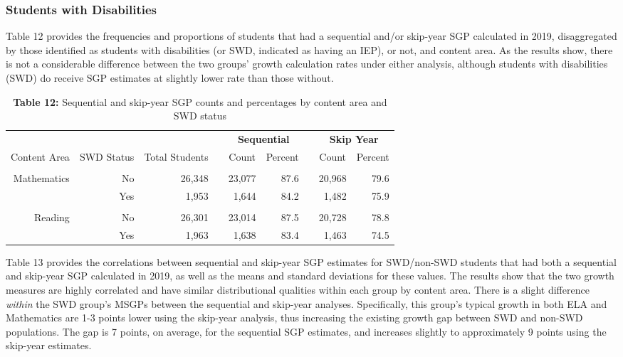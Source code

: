 \documentclass[12pt]{article}
\begin{document}
\hypertarget{students-with-disabilities}{%
\subsubsection{Students with
Disabilities}\label{students-with-disabilities}}

Table 12 provides the frequencies and proportions of students that had a
sequential and/or skip-year SGP calculated in 2019, disaggregated by
those identified as students with disabilities (or SWD, indicated as
having an IEP), or not, and content area. As the results show, there is
not a considerable difference between the two groups' growth calculation
rates under either analysis, although students with disabilities (SWD)
do receive SGP estimates at slightly lower rate than those without.

\begin{table}[H]
\caption*{\textbf{Table 12:} Sequential and skip-year SGP counts and percentages by content area and SWD status\label{table12}} 
\begin{center}
\begin{tabular}{rrrcrrcrr}
\hline\hline
\multicolumn{3}{c}{\bfseries }&\multicolumn{1}{c}{\bfseries }&\multicolumn{2}{c}{\bfseries Sequential}&\multicolumn{1}{c}{\bfseries }&\multicolumn{2}{c}{\bfseries Skip Year}\tabularnewline
\cline{5-6} \cline{8-9}
\multicolumn{1}{c}{Content Area}&\multicolumn{1}{c}{SWD Status}&\multicolumn{1}{c}{Total Students}&\multicolumn{1}{c}{}&\multicolumn{1}{c}{Count}&\multicolumn{1}{c}{Percent}&\multicolumn{1}{c}{}&\multicolumn{1}{c}{Count}&\multicolumn{1}{c}{Percent}\tabularnewline
\hline
&&&&&&&&\tabularnewline
Mathematics&No&26,348&&23,077&87.6&&20,968&79.6\tabularnewline
&Yes&1,953&&1,644&84.2&&1,482&75.9\tabularnewline
\hline
&&&&&&&&\tabularnewline
Reading&No&26,301&&23,014&87.5&&20,728&78.8\tabularnewline
&Yes&1,963&&1,638&83.4&&1,463&74.5\tabularnewline
\hline
\end{tabular}\end{center}
\end{table}

Table 13 provides the correlations between sequential and skip-year SGP
estimates for SWD/non-SWD students that had both a sequential and
skip-year SGP calculated in 2019, as well as the means and standard
deviations for these values. The results show that the two growth
measures are highly correlated and have similar distributional qualities
within each group by content area. There is a slight difference
\emph{within} the SWD group's MSGPs between the sequential and skip-year
analyses. Specifically, this group's typical growth in both ELA and
Mathematics are 1-3 points lower using the skip-year analysis, thus
increasing the existing growth gap between SWD and non-SWD populations.
The gap is 7 points, on average, for the sequential SGP estimates, and
increases slightly to approximately 9 points using the skip-year
estimates.
\end{document}
